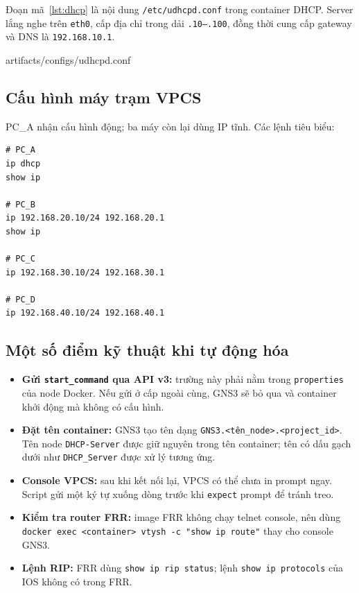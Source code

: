 \documentclass[12pt,a4paper]{article}
\begin{document}
Đoạn mã~\ref{lst:dhcp} là nội dung \texttt{/etc/udhcpd.conf} trong container DHCP. Server lắng
nghe trên \texttt{eth0}, cấp địa chỉ trong dải \texttt{.10--.100}, đồng thời cung cấp gateway và
DNS là \texttt{192.168.10.1}.


  {artifacts/configs/udhcpd.conf}

\subsection{Cấu hình máy trạm VPCS}

PC\_A nhận cấu hình động; ba máy còn lại dùng IP tĩnh. Các lệnh tiêu biểu:

\begin{lstlisting}[style=plaincode,caption={Lệnh cấu hình và kiểm tra trên VPCS.},label={lst:vpcs}]
# PC_A
ip dhcp
show ip

# PC_B
ip 192.168.20.10/24 192.168.20.1
show ip

# PC_C
ip 192.168.30.10/24 192.168.30.1

# PC_D
ip 192.168.40.10/24 192.168.40.1
\end{lstlisting}

\subsection{Một số điểm kỹ thuật khi tự động hóa}

\begin{itemize}[leftmargin=1.6em,itemsep=2pt]
  \item \textbf{Gửi \texttt{start\_command} qua API v3:} trường này phải nằm trong
        \texttt{properties} của node Docker. Nếu gửi ở cấp ngoài cùng, GNS3 sẽ bỏ qua và container
        khởi động mà không có cấu hình.
  \item \textbf{Đặt tên container:} GNS3 tạo tên dạng
        \texttt{GNS3.<tên\_node>.<project\_id>}. Tên node \texttt{DHCP-Server} được giữ nguyên
        trong tên container; tên có dấu gạch dưới như \texttt{DHCP\_Server} được xử lý tương ứng.
  \item \textbf{Console VPCS:} sau khi kết nối lại, VPCS có thể chưa in prompt ngay. Script gửi
        một ký tự xuống dòng trước khi \texttt{expect} prompt để tránh treo.
  \item \textbf{Kiểm tra router FRR:} image FRR không chạy telnet console, nên dùng
        \texttt{docker exec <container> vtysh -c "show ip route"} thay cho console GNS3.
  \item \textbf{Lệnh RIP:} FRR dùng \texttt{show ip rip status}; lệnh
        \texttt{show ip protocols} của IOS không có trong FRR.
\end{itemize}
\end{document}

